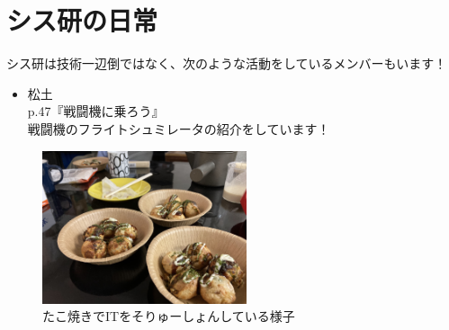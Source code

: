\chapter{シス研の日常}

シス研は技術一辺倒ではなく、次のような活動をしているメンバーもいます！

\begin{itemize}
  \item 松土 \\
        p.47『戦闘機に乗ろう』 \\
        戦闘機のフライトシュミレータの紹介をしています！ \\
\end{itemize} 

\begin{figure}[H]
  \centering
  \includegraphics[width=6cm]{./image/04-Intarasting/takoyaki_soryusyon.jpg}
  \caption{たこ焼きでITをそりゅーしょんしている様子}
  \label{takoyaki_soryusyon}
\end{figure}